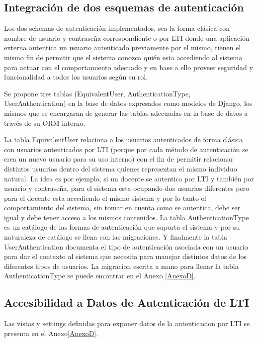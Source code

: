 \subsection{Integración de dos esquemas de autenticación}
Los dos schemas de autenticación implementados, sea la forma clásica con nombre de usuario y contraseña correspondiente o por LTI  donde una aplicación externa autentica un usuario autenticado previamente por el mismo, tienen el mismo fin de permitir que el sistema conozca quién esta accediendo al sistema para actuar con el comportamiento adecuado y en base a ello proveer seguridad y funcionalidad a todos los usuarios según su rol.

Se propone tres tablas (EquivalentUser, AuthenticationType, UserAuthentication) en la base de datos expresados como modelos de Django, los mismos que se encargaran de generar las tablas adecuadas en la base de datos a través de su ORM interno.

La tabla EquivalentUser relaciona a los usuarios autenticados de forma clásica con usuarios autenticados por LTI  (porque por cada método de autenticación se crea un nuevo usuario para su uso interno) con el fin de permitir relacionar distintos usuarios dentro del sistema quienes representan el mismo individuo natural. La idea es por ejemplo, si un docente se autentica por LTI  y también por usuario y contraseña, para el sistema esta ocupando dos usuarios diferentes pero para el docente esta accediendo el mismo sistema y por lo tanto el comportamiento del sistema, sin tomar en cuenta como se autentica, debe ser igual y debe tener acceso a los mismos contenidos. La tabla AuthenticationType es un catálogo de las formas de autenticación que suporta el sistema y por su naturaleza de catálogo se llena con las migraciones. Y finalmente la tabla UserAuthentication documenta el tipo de autenticación asociada con un usuario para dar el contexto al sistema que necesita para manejar distintos datos de los diferentes tipos de usuarios. La migracion escrita a mano para llenar la tabla AuthenticationType se puede encontrar en el Anexo \ref{AnexoD}.

\subsection{Accesibilidad a Datos de Autenticación de LTI}
Las vistas y settings definidas para exponer datos de la autenticacion por LTI se presenta en el Anexo\ref{AnexoD}.

